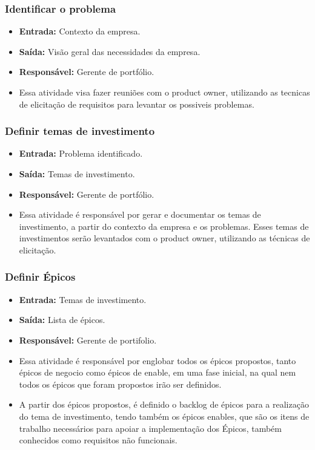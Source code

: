 \subsubsection{Identificar o problema}
  \begin{itemize}
    \item \textbf{Entrada:} Contexto da empresa.
    \item \textbf{Saída:} Visão geral das necessidades da empresa.
    \item \textbf{Responsável:} Gerente de portfólio.
    \item Essa atividade visa fazer reuniões com o product owner, utilizando as tecnicas de elicitação de requisitos para levantar os
      possiveis problemas.
  \end{itemize}

\subsubsection{Definir temas de investimento}
  \begin{itemize}
    \item \textbf{Entrada:} Problema identificado.
    \item \textbf{Saída:} Temas de investimento.
    \item \textbf{Responsável:} Gerente de portfólio.
    \item Essa atividade é responsável por gerar e documentar os temas de investimento, a partir do contexto da empresa e os problemas.
      Esses temas de investimentos serão levantados com o product owner, utilizando as técnicas de elicitação.
  \end{itemize}

\subsubsection{Definir Épicos}
  \begin{itemize}
    \item \textbf{Entrada:} Temas de investimento.
    \item \textbf{Saída:} Lista de épicos.
    \item \textbf{Responsável:} Gerente de portifolio.
    \item Essa atividade é responsável por englobar todos os épicos propostos, tanto épicos de negocio como épicos de enable, em uma fase
      inicial, na qual nem todos os épicos que foram propostos irão ser definidos.
    \item A partir dos épicos propostos, é definido o backlog de épicos para a realização do tema de investimento, tendo também os épicos
      enables, que são os itens de trabalho necessários para apoiar   a implementação dos Épicos, também conhecidos como requisitos não
      funcionais.
  \end{itemize}

